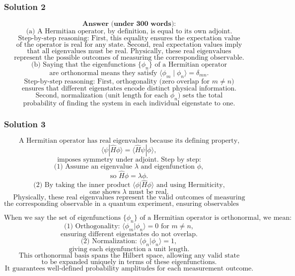 \documentclass{article}
\begin{document}
\subsubsection{Solution 2}
\[
\textbf{Answer (under 300 words):}
\]
\[
\text{(a) A Hermitian operator, by definition, is equal to its own adjoint.}
\]
\[
\text{Step-by-step reasoning: First, this equality ensures the expectation value}
\]
\[
\text{of the operator is real for any state. Second, real expectation values imply}
\]
\[
\text{that all eigenvalues must be real. Physically, these real eigenvalues}
\]
\[
\text{represent the possible outcomes of measuring the corresponding observable.}
\]
\[
\text{(b) Saying that the eigenfunctions } \{\phi_n\} \text{ of a Hermitian operator}
\]
\[
\text{are orthonormal means they satisfy } \langle \phi_m \mid \phi_n \rangle = \delta_{mn}.
\]
\[
\text{Step-by-step reasoning: First, orthogonality (zero overlap for } m \neq n\text{)}
\]
\[
\text{ensures that different eigenstates encode distinct physical information.}
\]
\[
\text{Second, normalization (unit length for each } \phi_n\text{) sets the total}
\]
\[
\text{probability of finding the system in each individual eigenstate to one.}
\]


\subsubsection{Solution 3}
\[
\text{A Hermitian operator has real eigenvalues because its defining property,}
\]
\[
\langle \psi | \hat{H} \phi \rangle = \langle \hat{H} \psi | \phi \rangle,
\]
\[
\text{imposes symmetry under adjoint. Step by step:}
\]
\[
\text{(1) Assume an eigenvalue } \lambda \text{ and eigenfunction } \phi,
\]
\[
\text{so } \hat{H} \phi = \lambda \phi.
\]
\[
\text{(2) By taking the inner product } \langle \phi | \hat{H} \phi \rangle
\text{ and using Hermiticity,}
\]
\[
\text{one shows } \lambda \text{ must be real.}
\]
\[
\text{Physically, these real eigenvalues represent the valid outcomes of measuring}
\]
\[
\text{the corresponding observable in a quantum experiment, ensuring observables yield real values.}
\]

\[
\text{When we say the set of eigenfunctions } \{\phi_n\}
\text{ of a Hermitian operator is orthonormal, we mean:}
\]
\[
\text{(1) Orthogonality: } \langle \phi_m | \phi_n \rangle = 0 \text{ for } m \neq n,
\]
\[
\text{ensuring different eigenstates do not overlap.}
\]
\[
\text{(2) Normalization: } \langle \phi_n | \phi_n \rangle = 1,
\]
\[
\text{giving each eigenfunction a unit length.}
\]
\[
\text{This orthonormal basis spans the Hilbert space, allowing any valid state}
\]
\[
\text{to be expanded uniquely in terms of these eigenfunctions.}
\]
\[
\text{It guarantees well-defined probability amplitudes for each measurement outcome.}
\]
\end{document}
